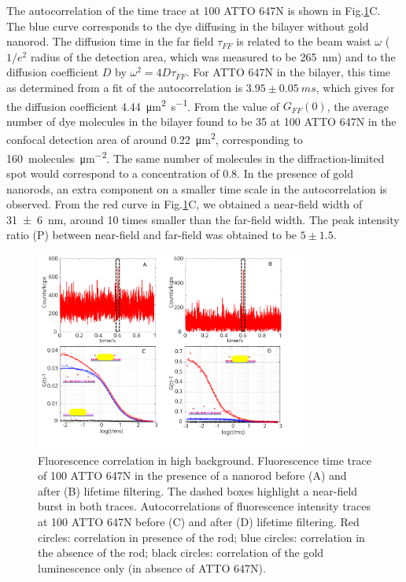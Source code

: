The autocorrelation of the time trace at \SI{100}{\nM} ATTO 647N is shown in Fig.\ref{fig:corr_enhnc}C.
The blue curve corresponds to the dye diffusing in the bilayer without gold nanorod.
The diffusion time in the far field $\tau_{FF}$ is related to the beam waist $\omega$ ($1/e^2$ radius of the detection area, which was measured to be \SI{265}{\nm}) and to the diffusion coefficient $D$ by $\omega^2=4D\tau_{FF}$.
For ATTO 647N in the bilayer, this time as determined from a fit of the autocorrelation is $3.95\pm0.05~ms$, which gives for the diffusion coefficient \SI{4.44}{\um\squared\per\s}.
From the value of $G_{FF}(0)$, the average number of dye molecules in the bilayer found to be 35 at \SI{100}{\nM} ATTO 647N in the confocal detection area of around \SI{0.22}{\um\squared}, corresponding to \SI{160}{ molecules\per\um\squared}.
The same number of molecules in the diffraction-limited spot would correspond to a concentration of \SI{0.8}{\uM}.
In the presence of gold nanorods, an extra component on a smaller time scale in the autocorrelation is observed.
From the red curve in Fig.\ref{fig:corr_enhnc}C, we obtained a near-field width of \SI[separate-uncertainty = true]{31(6)}{\nm}, around 10 times smaller than the far-field width.
The peak intensity ratio (P) between near-field and far-field was obtained to be $5\pm1.5$.

\begin{figure}[ht]
	\centering
	\includegraphics[width=0.8\textwidth]{corr_enhnc}
	\caption{Fluorescence correlation in high background. Fluorescence time trace of \SI{100}{\nM} ATTO 647N in the 
	presence of a nanorod before (A) and after (B) lifetime filtering. The dashed boxes highlight a near-field 
	burst in both traces. Autocorrelations of fluorescence intensity traces at \SI{100}{\nM} ATTO 647N before (C) and 
	after (D) lifetime filtering. Red circles: correlation in presence of the rod; blue circles: correlation in the 
	absence of the rod; black circles: correlation of the gold luminescence only (in absence of ATTO 647N).}
	\label{fig:corr_enhnc}
\end{figure}


